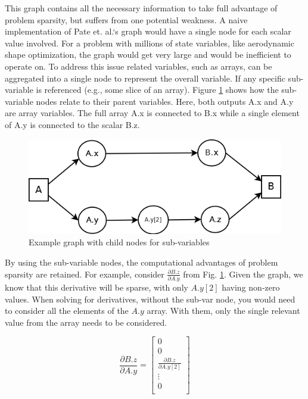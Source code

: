 \documentclass[]{aiaa-tc} %
\begin{document}
        This graph contains all the necessary information to take full advantage of problem sparsity, 
        but suffers from one potential weakness. A naive implementation of Pate et. al.`s graph would have a 
        single node for each scalar value involved. For a problem with millions of state variables, like 
        aerodynamic shape optimization, the graph would get very large and would be inefficient to operate on. 
        To address this issue related variables, such as arrays, can be aggregated into a single node to
        represent the overall variable. If any specific sub-variable is referenced 
        (e.g., some slice of an array). Figure \ref{fig:subvars} shows how the sub-variable nodes relate to their parent variables. Here,
        both outputs A.x and A.y are array variables. The full array A.x is connected to B.x while a single element
        of A.y is connected to the scalar B.z.

        \begin{figure}[!htb]\begin{center}
          \includegraphics[width=.8\textwidth]{images/Graph1}
          \caption{ Example graph with child nodes for sub-variables \label{fig:subvars}}
        \end{center}\end{figure}

        By using the sub-variable nodes, the computational advantages of problem sparsity are retained. For example, 
        consider $\frac{\partial B.z}{\partial A.y}$ from Fig. \ref{fig:subvars}. Given the graph, we know that
        this derivative will be sparse, with only $A.y[2]$ having non-zero values. When solving for derivatives, 
        without the sub-var node, you would need to consider all the elements of the $A.y$ array. With them, only 
        the single relevant value from the array needs to be considered. 

        \begin{equation} 
            \frac{\partial B.z}{\partial A.y} = 
            \begin{bmatrix} 
                0 \\
                0 \\ 
                \frac{\partial B.z}{\partial A.y[2]} \\
                \vdots \\
                0 \\
            \end{bmatrix}
        \end{equation} 
\end{document}
